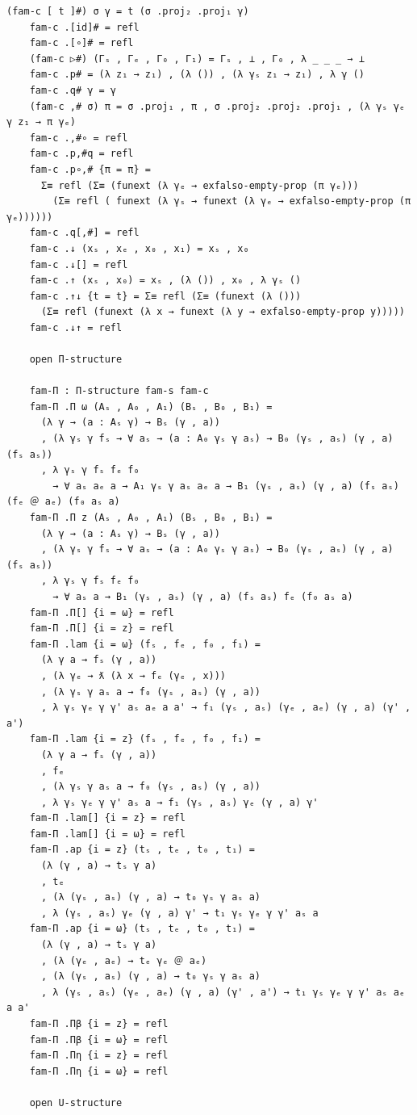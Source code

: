 \documentclass[10pt,a4paper]{article}
\theoremstyle{definition}
\theoremstyle{remark}
\begin{document}
{\begin{Verbatim}[breaklines=true,breakanywhere=true,fontsize=\scriptsize]
    (fam-c [ t ]#) σ γ = t (σ .proj₂ .proj₁ γ)
    fam-c .[id]# = refl
    fam-c .[∘]# = refl
    (fam-c ▷#) (Γₛ , Γₑ , Γ₀ , Γ₁) = Γₛ , ⊥ , Γ₀ , λ _ _ _ → ⊥
    fam-c .p# = (λ z₁ → z₁) , (λ ()) , (λ γₛ z₁ → z₁) , λ γ ()
    fam-c .q# γ = γ
    (fam-c ,# σ) π = σ .proj₁ , π , σ .proj₂ .proj₂ .proj₁ , (λ γₛ γₑ γ z₁ → π γₑ)
    fam-c .,#∘ = refl
    fam-c .p,#q = refl
    fam-c .p∘,# {π = π} =
      Σ≡ refl (Σ≡ (funext (λ γₑ → exfalso-empty-prop (π γₑ)))
        (Σ≡ refl ( funext (λ γₛ → funext (λ γₑ → exfalso-empty-prop (π γₑ))))))
    fam-c .q[,#] = refl
    fam-c .↓ (xₛ , xₑ , x₀ , x₁) = xₛ , x₀
    fam-c .↓[] = refl
    fam-c .↑ (xₛ , x₀) = xₛ , (λ ()) , x₀ , λ γₛ ()
    fam-c .↑↓ {t = t} = Σ≡ refl (Σ≡ (funext (λ ()))
      (Σ≡ refl (funext (λ x → funext (λ y → exfalso-empty-prop y)))))
    fam-c .↓↑ = refl

    open Π-structure

    fam-Π : Π-structure fam-s fam-c
    fam-Π .Π ω (Aₛ , A₀ , A₁) (Bₛ , B₀ , B₁) =
      (λ γ → (a : Aₛ γ) → Bₛ (γ , a))
      , (λ γₛ γ fₛ → ∀ aₛ → (a : A₀ γₛ γ aₛ) → B₀ (γₛ , aₛ) (γ , a) (fₛ aₛ))
      , λ γₛ γ fₛ fₑ f₀
        → ∀ aₛ aₑ a → A₁ γₛ γ aₛ aₑ a → B₁ (γₛ , aₛ) (γ , a) (fₛ aₛ) (fₑ ＠ aₑ) (f₀ aₛ a)
    fam-Π .Π z (Aₛ , A₀ , A₁) (Bₛ , B₀ , B₁) =
      (λ γ → (a : Aₛ γ) → Bₛ (γ , a))
      , (λ γₛ γ fₛ → ∀ aₛ → (a : A₀ γₛ γ aₛ) → B₀ (γₛ , aₛ) (γ , a) (fₛ aₛ))
      , λ γₛ γ fₛ fₑ f₀
        → ∀ aₛ a → B₁ (γₛ , aₛ) (γ , a) (fₛ aₛ) fₑ (f₀ aₛ a)
    fam-Π .Π[] {i = ω} = refl
    fam-Π .Π[] {i = z} = refl
    fam-Π .lam {i = ω} (fₛ , fₑ , f₀ , f₁) =
      (λ γ a → fₛ (γ , a))
      , (λ γₑ → ƛ (λ x → fₑ (γₑ , x)))
      , (λ γₛ γ aₛ a → f₀ (γₛ , aₛ) (γ , a))
      , λ γₛ γₑ γ γ' aₛ aₑ a a' → f₁ (γₛ , aₛ) (γₑ , aₑ) (γ , a) (γ' , a')
    fam-Π .lam {i = z} (fₛ , fₑ , f₀ , f₁) =
      (λ γ a → fₛ (γ , a))
      , fₑ
      , (λ γₛ γ aₛ a → f₀ (γₛ , aₛ) (γ , a))
      , λ γₛ γₑ γ γ' aₛ a → f₁ (γₛ , aₛ) γₑ (γ , a) γ' 
    fam-Π .lam[] {i = z} = refl
    fam-Π .lam[] {i = ω} = refl
    fam-Π .ap {i = z} (tₛ , tₑ , t₀ , t₁) =
      (λ (γ , a) → tₛ γ a)
      , tₑ
      , (λ (γₛ , aₛ) (γ , a) → t₀ γₛ γ aₛ a)
      , λ (γₛ , aₛ) γₑ (γ , a) γ' → t₁ γₛ γₑ γ γ' aₛ a
    fam-Π .ap {i = ω} (tₛ , tₑ , t₀ , t₁) =
      (λ (γ , a) → tₛ γ a)
      , (λ (γₑ , aₑ) → tₑ γₑ ＠ aₑ)
      , (λ (γₛ , aₛ) (γ , a) → t₀ γₛ γ aₛ a)
      , λ (γₛ , aₛ) (γₑ , aₑ) (γ , a) (γ' , a') → t₁ γₛ γₑ γ γ' aₛ aₑ a a'
    fam-Π .Πβ {i = z} = refl
    fam-Π .Πβ {i = ω} = refl
    fam-Π .Πη {i = z} = refl
    fam-Π .Πη {i = ω} = refl

    open U-structure


\end{Verbatim}}
\end{document}
